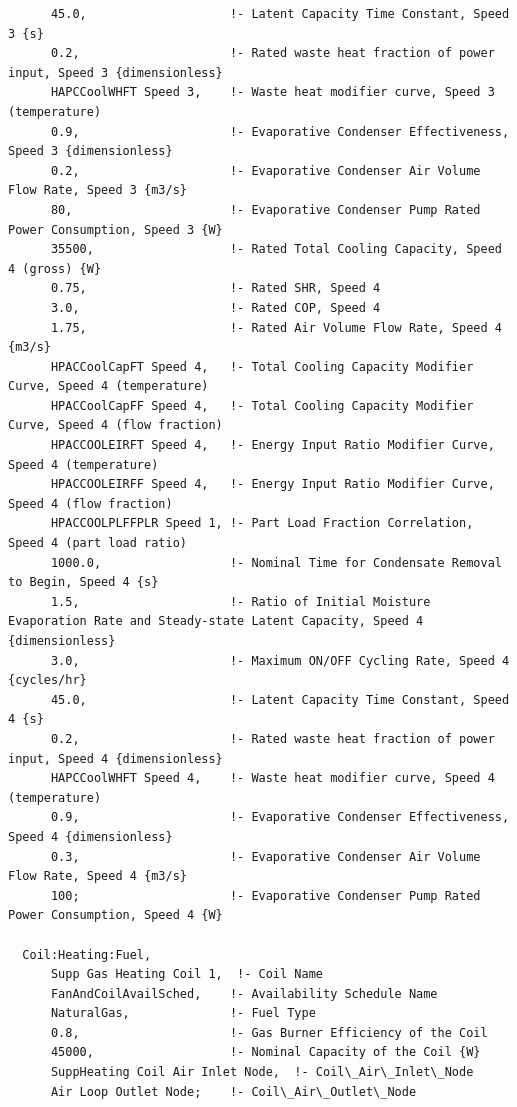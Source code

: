 \begin{lstlisting}
      45.0,                    !- Latent Capacity Time Constant, Speed 3 {s}
      0.2,                     !- Rated waste heat fraction of power input, Speed 3 {dimensionless}
      HAPCCoolWHFT Speed 3,    !- Waste heat modifier curve, Speed 3 (temperature)
      0.9,                     !- Evaporative Condenser Effectiveness, Speed 3 {dimensionless}
      0.2,                     !- Evaporative Condenser Air Volume Flow Rate, Speed 3 {m3/s}
      80,                      !- Evaporative Condenser Pump Rated Power Consumption, Speed 3 {W}
      35500,                   !- Rated Total Cooling Capacity, Speed 4 (gross) {W}
      0.75,                    !- Rated SHR, Speed 4
      3.0,                     !- Rated COP, Speed 4
      1.75,                    !- Rated Air Volume Flow Rate, Speed 4 {m3/s}
      HPACCoolCapFT Speed 4,   !- Total Cooling Capacity Modifier Curve, Speed 4 (temperature)
      HPACCoolCapFF Speed 4,   !- Total Cooling Capacity Modifier Curve, Speed 4 (flow fraction)
      HPACCOOLEIRFT Speed 4,   !- Energy Input Ratio Modifier Curve, Speed 4 (temperature)
      HPACCOOLEIRFF Speed 4,   !- Energy Input Ratio Modifier Curve, Speed 4 (flow fraction)
      HPACCOOLPLFFPLR Speed 1, !- Part Load Fraction Correlation, Speed 4 (part load ratio)
      1000.0,                  !- Nominal Time for Condensate Removal to Begin, Speed 4 {s}
      1.5,                     !- Ratio of Initial Moisture Evaporation Rate and Steady-state Latent Capacity, Speed 4 {dimensionless}
      3.0,                     !- Maximum ON/OFF Cycling Rate, Speed 4 {cycles/hr}
      45.0,                    !- Latent Capacity Time Constant, Speed 4 {s}
      0.2,                     !- Rated waste heat fraction of power input, Speed 4 {dimensionless}
      HAPCCoolWHFT Speed 4,    !- Waste heat modifier curve, Speed 4 (temperature)
      0.9,                     !- Evaporative Condenser Effectiveness, Speed 4 {dimensionless}
      0.3,                     !- Evaporative Condenser Air Volume Flow Rate, Speed 4 {m3/s}
      100;                     !- Evaporative Condenser Pump Rated Power Consumption, Speed 4 {W}

  Coil:Heating:Fuel,
      Supp Gas Heating Coil 1,  !- Coil Name
      FanAndCoilAvailSched,    !- Availability Schedule Name
      NaturalGas,              !- Fuel Type
      0.8,                     !- Gas Burner Efficiency of the Coil
      45000,                   !- Nominal Capacity of the Coil {W}
      SuppHeating Coil Air Inlet Node,  !- Coil\_Air\_Inlet\_Node
      Air Loop Outlet Node;    !- Coil\_Air\_Outlet\_Node


\end{lstlisting}

